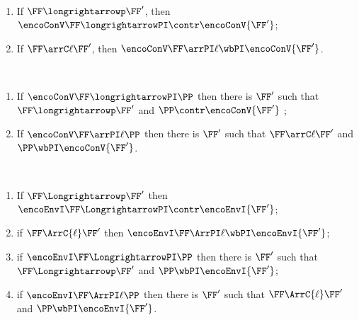  
\begin{lemma}
\label{l:opcorrCOGS}
$ $ \begin{enumerate}

\item If $\FF \longrightarrowp \FF'$, then 
$ \encoConV \FF \longrightarrowPI  \contr \encoConV {\FF'}$;


\item If $\FF \arrC\ell \FF'$, then
$ \encoConV \FF \arrPI\ell  
\wbPI
\encoConV {\FF'}$.
\end{enumerate} 
\end{lemma} 

\begin{lemma}
\label{l:opcorrCOGS2}
$ $ \begin{enumerate}


\item If 
$ \encoConV \FF \longrightarrowPI \PP$ then there is $\FF'$ such that 
$\FF \longrightarrowp \FF'$  and  
$\PP   \contr \encoConV {\FF'}$ ; 


\item If
$ \encoConV \FF \arrPI\ell \PP$
 then there is $\FF'$ such that
 $\FF \arrC\ell \FF'$
and $\PP \wbPI \encoConV {\FF'}$.

\end{enumerate} 
\end{lemma} 
 

\DSOCTe

\begin{theorem}
\label{t:COGS_pi}
$ $ \begin{enumerate}

\item
If   $\FF \Longrightarrowp \FF'$ then 
$\encoEnvI \FF \LongrightarrowPI  
\contr
\encoEnvI {\FF'}$;

\item
if   $\FF \ArrC{\ell} \FF'$ then 
$\encoEnvI \FF \ArrPI\ell  
\wbPI
\encoEnvI {\FF'}$;

\item %
if 
$\encoEnvI \FF \LongrightarrowPI   \PP$ then there is $\FF'$ such that 
   $\FF  \Longrightarrowp  \FF'$ and
$\PP  \wbPI
\encoEnvI {\FF'}$;

\item %
if 
$\encoEnvI \FF \ArrPI\ell   \PP$ then there is $\FF'$ such that 
   $\FF  \ArrC{\ell} \FF'$ and
$\PP \wbPI
\encoEnvI {\FF'}$.
 \end{enumerate} 
\end{theorem} 

